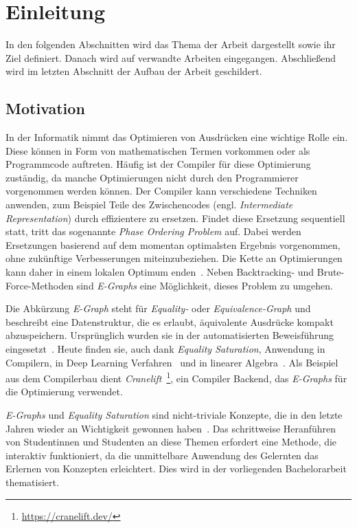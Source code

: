 \section{Einleitung}\label{sec:einleitung}

In den folgenden Abschnitten wird das Thema der Arbeit dargestellt sowie ihr Ziel definiert.
Danach wird auf verwandte Arbeiten eingegangen.
Abschließend wird im letzten Abschnitt der Aufbau der Arbeit geschildert.

\subsection{Motivation}

\noindent In der Informatik nimmt das Optimieren von Ausdrücken eine wichtige Rolle ein. 
Diese können in Form von mathematischen Termen vorkommen oder als Programmcode auftreten.
Häufig ist der Compiler für diese Optimierung zuständig, da manche Optimierungen nicht durch den Programmierer vorgenommen werden können. 
Der Compiler kann verschiedene Techniken anwenden, zum Beispiel Teile des Zwischencodes (engl. \textit{Intermediate Representation}) durch effizientere zu ersetzen.
Findet diese Ersetzung sequentiell statt, tritt das sogenannte \textit{Phase Ordering Problem} auf. 
Dabei werden Ersetzungen basierend auf dem momentan optimalsten Ergebnis vorgenommen, ohne zukünftige Verbesserungen miteinzubeziehen.
Die Kette an Optimierungen kann daher in einem lokalen Optimum enden~\cite{phaseorder-2009}.
Neben Backtracking- und Brute-Force-Methoden sind \textit{E-Graphs} eine Möglichkeit, dieses Problem zu umgehen. 

\noindent Die Abkürzung \textit{E-Graph} steht für \textit{Equality-} oder \textit{Equivalence-Graph} und beschreibt eine Datenstruktur, die es
erlaubt, äquivalente Ausdrücke kompakt abzuspeichern.
Ursprünglich wurden sie in der automatisierten Beweisführung eingesetzt~\cite{2021-egg}. Heute finden sie, auch dank \textit{Equality Saturation}, Anwendung in Compilern, in 
Deep Learning Verfahren~\cite{yang2021} und in linearer Algebra~\cite{wang2020}.
Als Beispiel aus dem Compilerbau dient \textit{Cranelift}~\footnote{\hspace{1.5mm}\url{https://cranelift.dev/}}, ein Compiler Backend, das \textit{E-Graphs} für die Optimierung verwendet.

\noindent \textit{E-Graphs} und \textit{Equality Saturation} sind nicht-triviale Konzepte, die in den letzte Jahren wieder an Wichtigkeit gewonnen haben~\cite[S.~2]{eqsatexploration}.
Das schrittweise Heranführen von Studentinnen und Studenten an diese Themen erfordert eine Methode, die interaktiv funktioniert, da die unmittelbare Anwendung des Gelernten 
das Erlernen von Konzepten erleichtert. Dies wird in der vorliegenden Bachelorarbeit thematisiert. 

